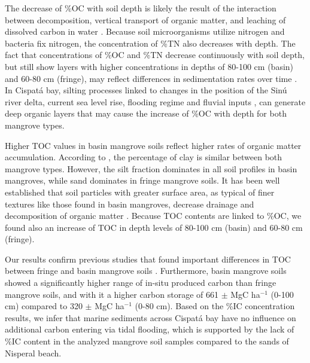 The decrease of \%OC with soil depth is likely the result of the interaction between decomposition, vertical transport of organic matter, and leaching of dissolved carbon in water \DIFaddbegin {}\DIFaddend . Because soil microorganisms utilize nitrogen and bacteria fix nitrogen, the concentration of \%TN also decreases with depth. The fact that concentrations of \%OC and \%TN decrease continuously with soil depth, but still show layers with higher concentrations in depths of 80-100 cm (basin) and 60-80 cm (fringe), may reflect differences in sedimentation rates over time \citep{Bolivar2015}. In Cispat\'{a} bay, silting processes linked to changes in the position of the Sin\'{u} river delta, current sea level rise, flooding regime and fluvial inputs  \DIFaddbegin {}\DIFaddend , can generate deep organic layers that may cause the increase of \%OC with depth for both mangrove types\DIFdelbegin {}\DIFdelend . 

Higher TOC values in basin mangrove soils reflect higher rates of organic matter accumulation. According to  \citet{Bolivar2015}, the percentage of clay is similar between both mangrove types. However, the silt fraction dominates in all soil profiles in basin mangroves, while sand dominates in fringe mangrove soils. It has been well established that soil particles with greater surface area, as typical of finer textures like those found in basin mangroves, decrease drainage and decomposition of organic matter \citep{prasad2008}. Because TOC contents are linked to \%OC, we found also an increase of TOC in depth levels of 80-100 cm (basin) and 60-80 cm (fringe).

Our results confirm previous studies that found important differences in TOC between fringe and basin mangrove soils \citep{Bolivar2015}. Furthermore, basin mangrove soils showed a significantly higher range of in-situ produced carbon than fringe mangrove soils, and with it a higher carbon storage of 661 $\pm$ \DIFdelbegin {}\DIFdelend \DIFaddbegin {}\DIFaddend MgC ha$^{-1}$ (0-100 cm) compared to 320 $\pm$ \DIFdelbegin {}\DIFdelend \DIFaddbegin {}\DIFaddend MgC ha$^{-1}$ (0-80 cm). Based on the \%IC concentration results, we infer that marine sediments across Cispat\'{a} bay have \DIFaddbegin {}\DIFaddend no influence on additional carbon entering via tidal flooding, which is supported by the lack of \%IC content in the analyzed mangrove soil samples compared to the sands of Nisperal beach.

